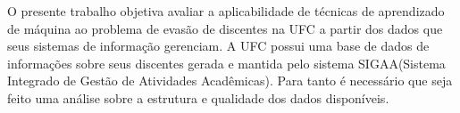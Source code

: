 
O presente trabalho objetiva avaliar a aplicabilidade de técnicas de aprendizado de máquina ao problema de evasão de discentes na UFC a partir dos dados que seus sistemas de informação gerenciam. A UFC possui uma base de dados de informações sobre seus discentes gerada e mantida pelo sistema SIGAA(Sistema Integrado de Gestão de Atividades Acadêmicas). Para tanto é necessário que seja feito uma análise sobre a estrutura e qualidade dos dados disponíveis.


